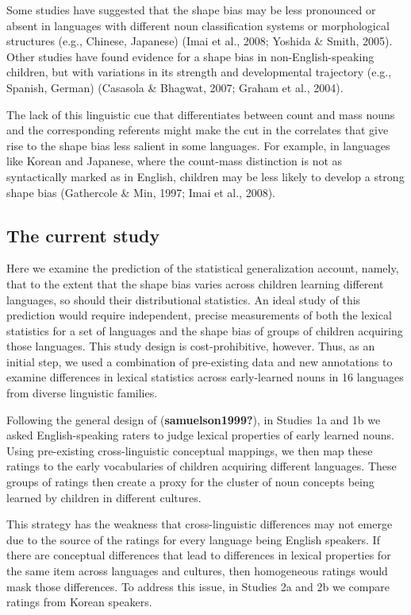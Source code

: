 \documentclass[
  american,
  man,floatsintext]{apa6}
\begin{document}
Some studies have suggested that the shape bias may be less pronounced or absent in languages with different noun classification systems or morphological structures (e.g., Chinese, Japanese) (Imai et al., 2008; Yoshida \& Smith, 2005). Other studies have found evidence for a shape bias in non-English-speaking children, but with variations in its strength and developmental trajectory (e.g., Spanish, German) (Casasola \& Bhagwat, 2007; Graham et al., 2004).

The lack of this linguistic cue that differentiates between count and mass nouns and the corresponding referents might make the cut in the correlates that give rise to the shape bias less salient in some languages. For example, in languages like Korean and Japanese, where the count-mass distinction is not as syntactically marked as in English, children may be less likely to develop a strong shape bias (Gathercole \& Min, 1997; Imai et al., 2008).

\subsection{The current study}\label{the-current-study}

Here we examine the prediction of the statistical generalization account, namely, that to the extent that the shape bias varies across children learning different languages, so should their distributional statistics. An ideal study of this prediction would require independent, precise measurements of both the lexical statistics for a set of languages and the shape bias of groups of children acquiring those languages. This study design is cost-prohibitive, however. Thus, as an initial step, we used a combination of pre-existing data and new annotations to examine differences in lexical statistics across early-learned nouns in 16 languages from diverse linguistic families.

Following the general design of (\textbf{samuelson1999?}), in Studies 1a and 1b we asked English-speaking raters to judge lexical properties of early learned nouns. Using pre-existing cross-linguistic conceptual mappings, we then map these ratings to the early vocabularies of children acquiring different languages. These groups of ratings then create a proxy for the cluster of noun concepts being learned by children in different cultures.

This strategy has the weakness that cross-linguistic differences may not emerge due to the source of the ratings for every language being English speakers. If there are conceptual differences that lead to differences in lexical properties for the same item across languages and cultures, then homogeneous ratings would mask those differences. To address this issue, in Studies 2a and 2b we compare ratings from Korean speakers.
\end{document}
